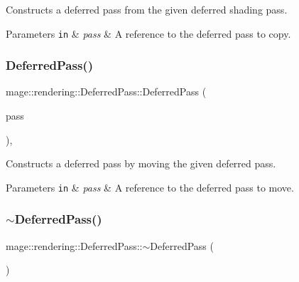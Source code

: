 Constructs a deferred pass from the given deferred shading pass.


\begin{DoxyParams}[1]{Parameters}
\mbox{\tt in}  & {\em pass} & A reference to the deferred pass to copy. \\
\hline
\end{DoxyParams}
\hypertarget{classmage_1_1rendering_1_1_deferred_pass_a606cd3fdf0c6b53e1125d431cf782a6d}{}\label{classmage_1_1rendering_1_1_deferred_pass_a606cd3fdf0c6b53e1125d431cf782a6d} 
\subsubsection{\texorpdfstring{Deferred\+Pass()}{DeferredPass()}\hspace{0.1cm}{\footnotesize\ttfamily [3/3]}}
{\footnotesize\ttfamily mage\+::rendering\+::\+Deferred\+Pass\+::\+Deferred\+Pass (\begin{DoxyParamCaption}\item[{\hyperlink{classmage_1_1rendering_1_1_deferred_pass}{Deferred\+Pass} \&\&}]{pass }\end{DoxyParamCaption})\hspace{0.3cm}{\ttfamily [default]}, {\ttfamily [noexcept]}}

Constructs a deferred pass by moving the given deferred pass.


\begin{DoxyParams}[1]{Parameters}
\mbox{\tt in}  & {\em pass} & A reference to the deferred pass to move. \\
\hline
\end{DoxyParams}
\hypertarget{classmage_1_1rendering_1_1_deferred_pass_a6b5138ee7624ecb17b30c1e337bd483e}{}\label{classmage_1_1rendering_1_1_deferred_pass_a6b5138ee7624ecb17b30c1e337bd483e} 
\subsubsection{\texorpdfstring{$\sim$\+Deferred\+Pass()}{~DeferredPass()}}
{\footnotesize\ttfamily mage\+::rendering\+::\+Deferred\+Pass\+::$\sim$\+Deferred\+Pass (\begin{DoxyParamCaption}{ }\end{DoxyParamCaption})\hspace{0.3cm}{\ttfamily [default]}}

